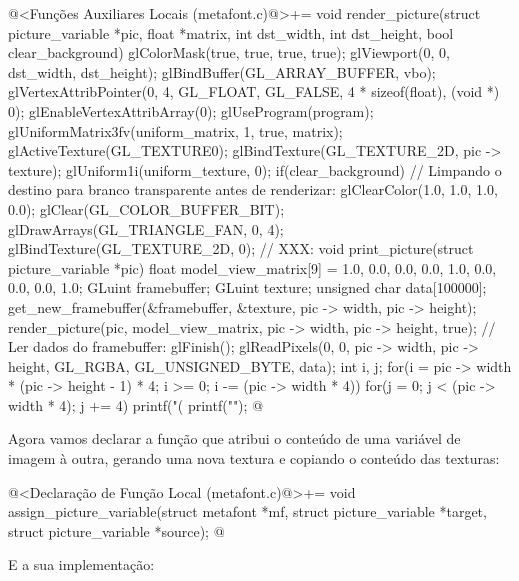 {\iniciocodigo
@<Funções Auxiliares Locais (metafont.c)@>+=
void render_picture(struct picture_variable *pic, float *matrix, int dst_width,
                    int dst_height, bool clear_background){
  glColorMask(true, true, true, true);
  glViewport(0, 0, dst_width, dst_height);
  glBindBuffer(GL_ARRAY_BUFFER, vbo);
  glVertexAttribPointer(0, 4, GL_FLOAT, GL_FALSE, 4 * sizeof(float), (void *) 0);
  glEnableVertexAttribArray(0);
  glUseProgram(program);
  glUniformMatrix3fv(uniform_matrix, 1, true, matrix);
  glActiveTexture(GL_TEXTURE0);
  glBindTexture(GL_TEXTURE_2D, pic -> texture);
  glUniform1i(uniform_texture, 0);
  if(clear_background){
    // Limpando o destino para branco transparente antes de renderizar:
    glClearColor(1.0, 1.0, 1.0, 0.0);
    glClear(GL_COLOR_BUFFER_BIT);
  }
  glDrawArrays(GL_TRIANGLE_FAN, 0, 4);
  glBindTexture(GL_TEXTURE_2D, 0);
}
// XXX:
void print_picture(struct picture_variable *pic){
  float model_view_matrix[9] = {1.0, 0.0, 0.0,
                               0.0, 1.0, 0.0,
                               0.0, 0.0, 1.0};
  GLuint framebuffer;
  GLuint texture;
  unsigned char data[100000];
  get_new_framebuffer(&framebuffer, &texture, pic -> width, pic -> height);
  render_picture(pic, model_view_matrix, pic -> width, pic -> height, true);
  // Ler dados do framebuffer:
  glFinish();
  glReadPixels(0, 0, pic -> width, pic -> height, GL_RGBA, GL_UNSIGNED_BYTE, data);
  {
    int i, j;
    for(i = pic -> width * (pic -> height - 1) * 4;
        i >= 0; i -= (pic -> width * 4)){
      for(j = 0; j < (pic -> width * 4); j += 4)
        printf("(%
        printf("\n");
    }
  }
}
@
\fimcodigo

Agora vamos declarar a função que atribui o conteúdo de uma variável
de imagem à outra, gerando uma nova textura e copiando o conteúdo das
texturas:

\iniciocodigo
@<Declaração de Função Local (metafont.c)@>+=
void assign_picture_variable(struct metafont *mf,
                             struct picture_variable *target,
                             struct picture_variable *source);
@
\fimcodigo

E a sua implementação:

}
